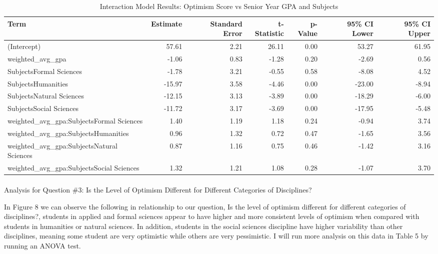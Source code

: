\documentclass[
  letterpaper,
  DIV=11,
  numbers=noendperiod]{scrartcl}
\makeatletter
\let\oldparagraph\paragraph
\renewcommand{\paragraph}{
    \@ifstar
      \xxxParagraphStar
      \xxxParagraphNoStar
  }
\newcommand{\xxxParagraphStar}[1]{\oldparagraph*{#1}\mbox{}}
\newcommand{\xxxParagraphNoStar}[1]{\oldparagraph{#1}\mbox{}}
\makeatother
\begin{document}
\begin{table}
\caption*{
{\large Interaction Model Results: Optimism Score vs Senior Year GPA and Subjects}
} 
\fontsize{12.0pt}{14.4pt}\selectfont
\begin{tabular*}{\linewidth}{@{\extracolsep{\fill}}lrrrrrr}
\toprule
Term & Estimate & Standard Error & t-Statistic & p-Value & 95\% CI Lower & 95\% CI Upper \\ 
\midrule\addlinespace[2.5pt]
(Intercept) & 57.61 & 2.21 & 26.11 & 0.00 & 53.27 & 61.95 \\ 
weighted\_avg\_gpa & -1.06 & 0.83 & -1.28 & 0.20 & -2.69 & 0.56 \\ 
SubjectsFormal Sciences & -1.78 & 3.21 & -0.55 & 0.58 & -8.08 & 4.52 \\ 
SubjectsHumanities & -15.97 & 3.58 & -4.46 & 0.00 & -23.00 & -8.94 \\ 
SubjectsNatural Sciences & -12.15 & 3.13 & -3.89 & 0.00 & -18.29 & -6.00 \\ 
SubjectsSocial Sciences & -11.72 & 3.17 & -3.69 & 0.00 & -17.95 & -5.48 \\ 
weighted\_avg\_gpa:SubjectsFormal Sciences & 1.40 & 1.19 & 1.18 & 0.24 & -0.94 & 3.74 \\ 
weighted\_avg\_gpa:SubjectsHumanities & 0.96 & 1.32 & 0.72 & 0.47 & -1.65 & 3.56 \\ 
weighted\_avg\_gpa:SubjectsNatural Sciences & 0.87 & 1.16 & 0.75 & 0.46 & -1.42 & 3.16 \\ 
weighted\_avg\_gpa:SubjectsSocial Sciences & 1.32 & 1.21 & 1.08 & 0.28 & -1.07 & 3.70 \\ 
\bottomrule
\end{tabular*}
\end{table}

\paragraph{Analysis for Question \#3: Is the Level of Optimism Different
for Different Categories of
Disciplines?}\label{analysis-for-question-3-is-the-level-of-optimism-different-for-different-categories-of-disciplines}

In Figure 8 we can observe the following in relationship to our
question, Is the level of optimism different for different categories of
disciplines?, students in applied and formal sciences appear to have
higher and more consistent levels of optimism when compared with
students in humanities or natural sciences. In addition, students in the
social sciences discipline have higher variability than other
disciplines, meaning some student are very optimistic while others are
very pessimistic. I will run more analysis on this data in Table 5 by
running an ANOVA test.
\end{document}
